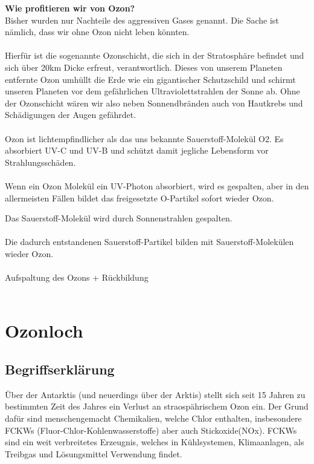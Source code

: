 \documentclass[11pt, a4paper]{article}
\begin{document}
\textbf{Wie profitieren wir von Ozon?}\\
Bisher wurden nur Nachteile des aggressiven Gases genannt. Die Sache ist nämlich, dass wir ohne Ozon nicht leben könnten.\\ \\ Hierfür ist die sogenannte Ozonschicht, die sich in der Stratosphäre befindet und sich über 20km Dicke erfreut, verantwortlich. Dieses von unserem Planeten entfernte Ozon umhüllt die Erde wie ein gigantischer Schutzschild und schirmt unseren Planeten vor dem gefährlichen Ultraviolettstrahlen der Sonne ab. Ohne der Ozonschicht wären wir also neben Sonnendbränden auch von Hautkrebs und Schädigungen der Augen gefährdet. \\ \\
Ozon ist lichtempfindlicher als das uns bekannte Sauerstoff-Molekül O2. Es absorbiert UV-C und UV-B und schützt damit jegliche Lebensform vor Strahlungsschäden. \\ \\
Wenn ein Ozon Molekül ein UV-Photon absorbiert, wird es gespalten, aber in den allermeisten Fällen bildet das freigesetzte O-Partikel sofort wieder Ozon. \\

\newpage
\begin{center}
Das Sauerstoff-Molekül wird durch Sonnenstrahlen gespalten. \\
 \\
Die dadurch entstandenen Sauerstoff-Partikel bilden mit Sauerstoff-Molekülen wieder Ozon. \\
 \\
Aufspaltung des Ozons + Rückbildung \\
 \\
\end{center}

\section{Ozonloch}
\subsection{Begriffserklärung}
Über der Antarktis (und neuerdings über der Arktis) stellt sich seit 15 Jahren zu bestimmten Zeit des Jahres ein Verlust an straospährischem Ozon ein. Der Grund dafür sind menschengemacht Chemikalien, welche Chlor enthalten, insbesondere FCKWs (Fluor-Chlor-Kohlenwasserstoffe) aber auch Stickoxide(NOx). FCKWs sind ein weit verbreitetes Erzeugnis, welches in Kühlsystemen, Klimaanlagen, als Treibgas und Lösungsmittel Verwendung findet.
\end{document}
